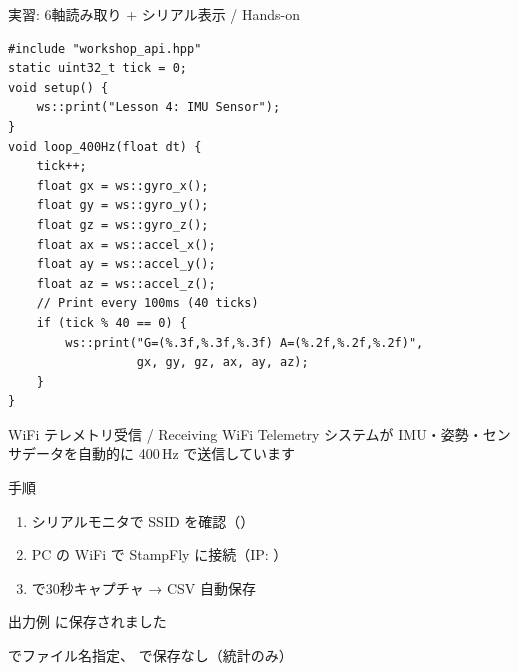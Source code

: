 \documentclass[aspectratio=169, 14pt]{beamer}
\begin{document}
\begin{frame}[fragile]{実習: 6軸読み取り + シリアル表示 / Hands-on}
  \begin{lstlisting}[style=sfcpp, title={student.cpp}]
#include "workshop_api.hpp"
static uint32_t tick = 0;
void setup() {
    ws::print("Lesson 4: IMU Sensor");
}
void loop_400Hz(float dt) {
    tick++;
    float gx = ws::gyro_x();
    float gy = ws::gyro_y();
    float gz = ws::gyro_z();
    float ax = ws::accel_x();
    float ay = ws::accel_y();
    float az = ws::accel_z();
    // Print every 100ms (40 ticks)
    if (tick % 40 == 0) {
        ws::print("G=(%.3f,%.3f,%.3f) A=(%.2f,%.2f,%.2f)",
                  gx, gy, gz, ax, ay, az);
    }
}
  \end{lstlisting}
\end{frame}

\begin{frame}{WiFi テレメトリ受信 / Receiving WiFi Telemetry}
  {\small システムが IMU・姿勢・センサデータを自動的に 400\,Hz で送信しています}
  \vspace{0.3em}
  \begin{block}{手順}
    \begin{enumerate}
      \item シリアルモニタで SSID を確認（）
      \item PC の WiFi で StampFly に接続（IP: ）
      \item {} で30秒キャプチャ → CSV 自動保存
    \end{enumerate}
  \end{block}

  \vspace{0.5em}

  \begin{exampleblock}{出力例}
     に保存されました
  \end{exampleblock}

  \vspace{0.3em}
  {\small
   でファイル名指定、 で保存なし（統計のみ）
  }
\end{frame}
\end{document}
